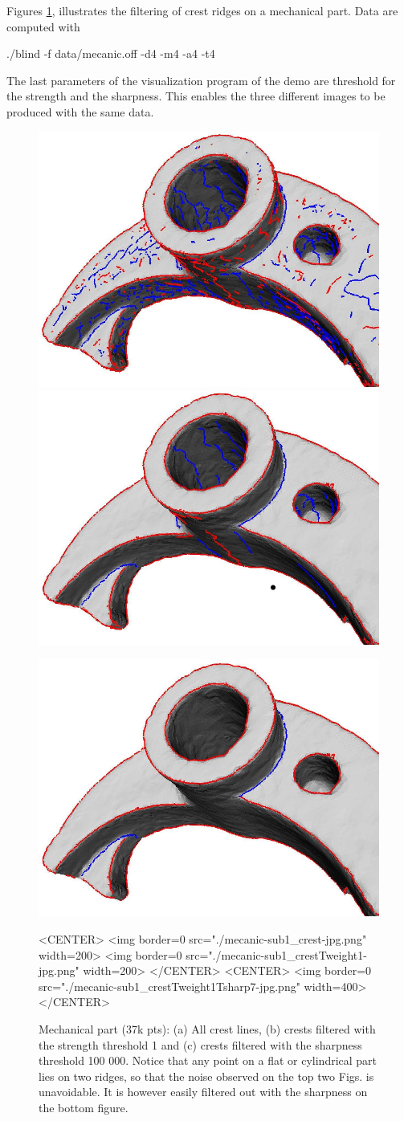 Figures \ref{fig:mechanical_crest_filtered-intro}, illustrates the
filtering of crest ridges on a mechanical part. Data are computed with 
\begin{ccExampleCode}
./blind -f data/mecanic.off -d4 -m4 -a4 -t4
\end{ccExampleCode}
The last parameters of the visualization program of the demo are
threshold for the strength and the sharpness. This enables the three
different images to be produced with the same data.

\begin{figure}[htb] 
\begin{ccTexOnly}
\centerline{ 
\includegraphics[width=.45\linewidth]{Ridges_3/mecanic-sub1_crest-jpg}
\includegraphics[width=.45\linewidth]{Ridges_3/mecanic-sub1_crestTweight1-jpg}}
\centerline{
\includegraphics[width=.6\linewidth]{Ridges_3/mecanic-sub1_crestTweight1Tsharp7-jpg}}
\end{ccTexOnly}

\begin{ccHtmlOnly}
<CENTER> <img border=0 src="./mecanic-sub1_crest-jpg.png" width=200>
 <img border=0 src="./mecanic-sub1_crestTweight1-jpg.png" width=200>
</CENTER>
<CENTER>
 <img border=0 src="./mecanic-sub1_crestTweight1Tsharp7-jpg.png" width=400>
</CENTER>
\end{ccHtmlOnly}
\caption{Mechanical part (37k pts): (a) All crest lines, (b) crests filtered
with the strength threshold 1 and (c) crests filtered with the sharpness threshold 100 000.
Notice that any point on a flat or cylindrical part lies on two
ridges, so that the noise observed on the top two Figs. is
unavoidable. It is however easily filtered out with the sharpness on
the bottom figure.}
\label{fig:mechanical_crest_filtered-intro} 
\end{figure} 
